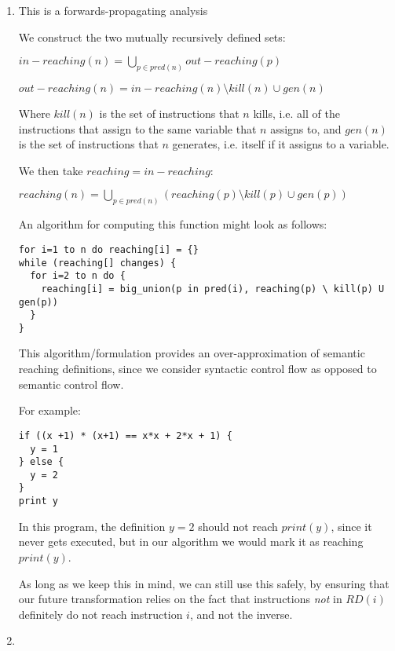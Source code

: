 


\begin{enumerate}[label=(\alph*)]
    \item

        This is a forwards-propagating analysis

        We construct the two mutually recursively defined sets:

        $in-reaching(n) = \bigcup_{p \in pred(n)} out-reaching(p)$

        $out-reaching(n) = in-reaching(n) \setminus kill(n) \cup gen(n)$

        Where $kill(n)$ is the set of instructions that $n$ kills, i.e. all of the instructions that assign to the same variable that $n$ assigns to, and $gen(n)$ is the set of instructions that $n$ generates, i.e. itself if it assigns to a variable.

        We then take $reaching = in-reaching$:

        $reaching(n) = \bigcup_{p \in pred(n)} (reaching(p) \setminus kill(p) \cup gen(p))$

        An algorithm for computing this function might look as follows:

\begin{verbatim}
for i=1 to n do reaching[i] = {}
while (reaching[] changes) {
  for i=2 to n do {
    reaching[i] = big_union(p in pred(i), reaching(p) \ kill(p) U gen(p))
  }
}
\end{verbatim}

This algorithm/formulation provides an over-approximation of semantic reaching definitions, since we consider syntactic control flow as opposed to semantic control flow.

For example:

\begin{verbatim}
if ((x +1) * (x+1) == x*x + 2*x + 1) {
  y = 1
} else {
  y = 2
}
print y
\end{verbatim}

In this program, the definition $y=2$ should not reach $print(y)$, since it never gets executed, but in our algorithm we would mark it as reaching $print(y)$.

As long as we keep this in mind, we can still use this safely, by ensuring that our future transformation relies on the fact that instructions \textit{not} in $RD(i)$ definitely do not reach instruction $i$, and not the inverse.

\item


\end{enumerate}
